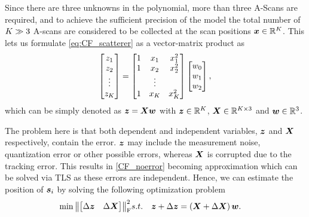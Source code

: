 Since there are three unknowns in the polynomial, more than three A-Scans are required, and to achieve the sufficient precision of the model the total number of $K \gg 3$ A-scans are considered to be collected at the scan positions $\bm{x} \in {\mathbb{R}}^{K}$. This lets us formulate \eqref{eq:CF_scatterer} as a vector-matrix product as
\begin{equation} \label{CF_noerror}
	\begin{bmatrix} z_1 \\ z_2 \\ \vdots \\ z_{\K} \end{bmatrix} =
	\begin{bmatrix} 1 & x_1 & x_{1}^{2} \\ 1 & x_2 & x_{2}^{2} \\ & \vdots &  \\ 1 & x_{\K} & x_{\K}^{2} \end{bmatrix}
	\begin{bmatrix} w_0 \\ w_1 \\ w_2\end{bmatrix},
\end{equation}
which can be simply denoted as $\bm{z} = \bm{X} \bm{w} $ with $\bm{z} \in {\mathbb{R}}^{K}$, $\bm{X} \in {\mathbb{R}}^{K \times 3}$ and $\bm{w} \in {\mathbb{R}}^{3}$. 

The problem here is that both dependent and independent variables, $\bm{z}$ and $\bm{X}$ respectively, contain the error. $\bm{z}$ may include the measurement noise, quantization error or other possible errors, whereas $\bm{X}$ is corrupted due to the tracking error. This results in \eqref{CF_noerror} becoming approximation which can be solved via TLS as these errors are independent. Hence, we can estimate the position of $\bm{s}_i$ by solving the following optimization problem 
\begin{eqnarray} \label{eq:CF_costfct}
	\hspace*{-0.4cm} \min \norm{\begin{bmatrix} \Delta \zz & \Delta \XX \end{bmatrix}}_{\Frob}^{2} 
	& \mbox{s.t.}  
	& \zzperturb = \left( \XXperturb \right) \ww.
\end{eqnarray}
